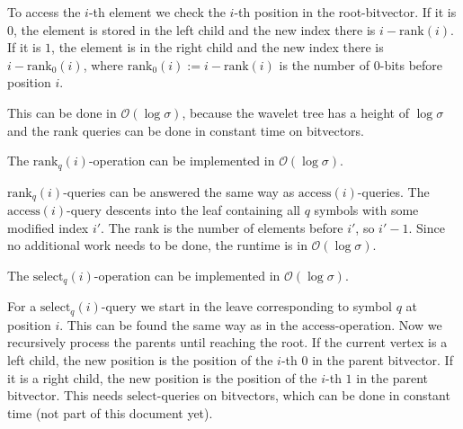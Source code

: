 \begin{Proof}
  To access the $i$-th element we check the $i$-th position in the root-bitvector. If it is $0$, the element is stored in the left child and the new index there is $i - \mathrm{rank}(i)$. If it is $1$, the element is in the right child and the new index there is $i - \mathrm{rank}_0(i)$, where $\mathrm{rank}_0(i) := i - \mathrm{rank}(i)$ is the number of $0$-bits before position $i$.

  This can be done in $\mathcal{O}(\log\sigma)$, because the wavelet tree has a height of $\log\sigma$ and the rank queries can be done in constant time on bitvectors.
\end{Proof}

\begin{Theorem}
  \label{thm:waveletTreeRank}
  The $\mathrm{rank}_q(i)$-operation can be implemented in $\mathcal{O}(\log \sigma)$.
\end{Theorem}

\begin{Proof}
  $\mathrm{rank}_q(i)$-queries can be answered the same way as $\mathrm{access}(i)$-queries. The $\mathrm{access}(i)$-query descents into the leaf containing all $q$ symbols with some modified index $i'$. The rank is the number of elements before $i'$, so $i'-1$. Since no additional work needs to be done, the runtime is in $\mathcal{O}(\log\sigma)$.
\end{Proof}

\begin{Theorem}
  \label{thm:waveletTreeSelect}
  The $\mathrm{select}_q(i)$-operation can be implemented in $\mathcal{O}(\log \sigma)$.
\end{Theorem}

\begin{Proof}
  For a $\mathrm{select}_q(i)$-query we start in the leave corresponding to symbol $q$ at position $i$. This can be found the same way as in the $\mathrm{access}$-operation. Now we recursively process the parents until reaching the root. If the current vertex is a left child, the new position is the position of the $i$-th $0$ in the parent bitvector. If it is a right child, the new position is the position of the $i$-th $1$ in the parent bitvector. This needs $\mathrm{select}$-queries on bitvectors, which can be done in constant time (not part of this document yet).
\end{Proof}
